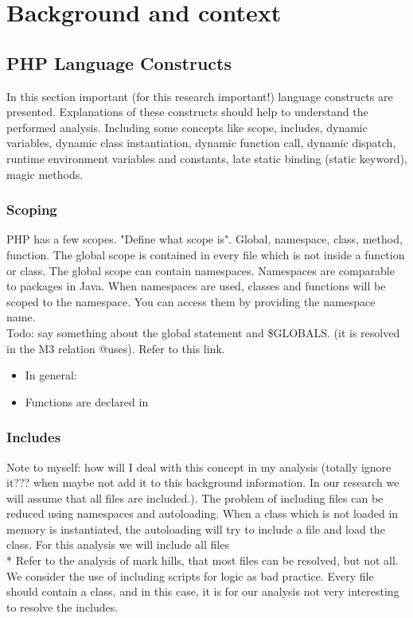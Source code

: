 \documentclass[../main.tex]{subfiles}
\begin{document}
    \chapter{Background and context}\label{chap:background}
    
    \section{PHP Language Constructs}
    In this section important (for this research important!) language constructs are presented.
    Explanations of these constructs should help to understand the performed analysis.
    Including some concepts like scope, includes, dynamic variables, dynamic class instantiation, dynamic function call, dynamic dispatch, runtime environment variables and constants, late static binding (static keyword), magic methods.
    
    \subsection{Scoping}
    PHP has a few scopes. "Define what scope is".
    Global, namespace, class, method, function.
    The global scope is contained in every file which is not inside a function or class.
    The global scope can contain namespaces.
    Namespaces are comparable to packages in Java.
    When namespaces are used, classes and functions will be scoped to the namespace.
    You can access them by providing the namespace name.
    \\
    Todo: say something about the global statement and \$GLOBALS. (it is resolved in the M3 relation @uses). Refer to this link\footnotemark.
        
    \begin{itemize}
        \item In general:
        \item Functions are declared in 

    \end{itemize}

    
    \subsection{Includes}
    Note to myself: how will I deal with this concept in my analysis (totally ignore it??? when maybe not add it to this background information. In our research we will assume that all files are included.).
    The problem of including files can be reduced using namespaces and autoloading.
    When a class which is not loaded in memory is instantiated, the autoloading will try to include a file and load the class. 
    For this analysis we will include all files 
    \\
    * Refer to the analysis of mark hills, that most files can be resolved, but not all. 
    We consider the use of including scripts for logic as bad practice. 
    Every file should contain a class, and in this case, it is for our analysis not very interesting to resolve the includes.
    
\end{document}
